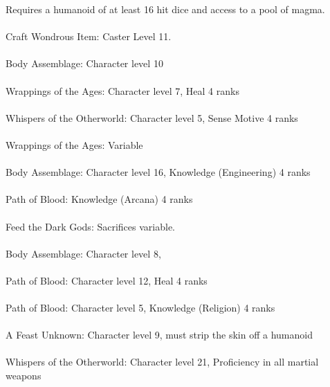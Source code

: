 \begin{multicols}{2}
\begin{small}
Requires a humanoid of at least 16 hit dice and access to a pool of magma.\\
\\
Craft Wondrous Item: Caster Level 11.\\
\\
Body Assemblage: Character level 10\\
\\
Wrappings of the Ages: Character level 7, Heal 4 ranks\\
\\
Whispers of the Otherworld: Character level 5, Sense Motive 4 ranks\\
\\
Wrappings of the Ages: Variable\\
\\
Body Assemblage: Character level 16, Knowledge (Engineering) 4 ranks\\
\\
Path of Blood: Knowledge (Arcana) 4 ranks\\
\\
Feed the Dark Gods: Sacrifices variable.\\
\\
Body Assemblage: Character level 8, \\
\\
Path of Blood: Character level 12, Heal 4 ranks\\
\\
Path of Blood: Character level 5, Knowledge (Religion) 4 ranks\\
\\
A Feast Unknown: Character level 9, must strip the skin off a humanoid\\
\\
Whispers of the Otherworld: Character level 21, Proficiency in all martial weapons\\
\\

\end{small}
\end{multicols}
